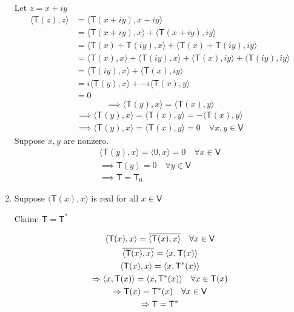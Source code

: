 \begin{enumerate}
 Let $
z = x + iy$
\begin{align}
\langle \mathsf{T}(z),z\rangle &= \langle \mathsf{T}(x+iy),x+iy\rangle
\\
&= \langle \mathsf{T}(x+iy),x\rangle + \langle
\mathsf{T}(x+iy),iy\rangle\\
&= \langle\mathsf{T}(x)+\mathsf{T}(iy),x\rangle + \langle
\mathsf{T}(x)+\mathsf{T}(iy),iy\rangle \\
&= \langle \mathsf{T}(x),x \rangle + \langle \mathsf{T}(iy),x \rangle +
\langle \mathsf{T}(x),iy\rangle + \langle \mathsf{T}(iy),iy\rangle\\
&= \langle \mathsf{T}(iy),x \rangle + \langle \mathsf{T}(x),iy\rangle
\\
&= i\langle\mathsf{T}(y),x \rangle + -i\langle\mathsf{T}(x),y\rangle\\
&= 0
\end{align}
\begin{equation}
\implies \langle\mathsf{T}(y),x \rangle = \langle\mathsf{T}(x),y\rangle
\end{equation}
\begin{gather}
\implies \langle\mathsf{T}(y),x \rangle =
\langle\mathsf{T}(x),y\rangle = - \langle\mathsf{T}(x),y\rangle\\
\implies \langle \mathsf{T}(y),x \rangle = \langle
\mathsf{T}(x),y\rangle =0 \quad \forall x,y \in \mathsf{V}
\end{gather}
Suppose $x,y$ are nonzero.
\begin{gather}
\langle \mathsf{T}(y),x\rangle = \langle 0,x\rangle = 0 \quad \forall
x \in \mathsf{V}\\
\implies \mathsf{T}(y) = 0 \quad \forall y \in \mathsf{V}\\
\implies \mathsf{T} = \mathsf{T}_0
\end{gather}
\item Suppose $\langle \mathsf{T}(x),x \rangle$ is real for all $x \in
  \mathsf{V}$

Claim: $\mathsf{T} = \mathsf{T}^*$

\begin{gather}
\langle \mathsf{T}(x),x \rangle = \overline{\langle
  \mathsf{T}(x),x\rangle}\quad \forall x \in \mathsf{V}\\
\overline{\langle \mathsf{T}(x),x \rangle} = \langle
x,\mathsf{T}(x)\rangle\\
\langle \mathsf{T}(x),x\rangle = \langle x,\mathsf{T}^*(x)\rangle\\
\implies \langle x, \mathsf{T}(x)\rangle = \langle x,\textsc{}
\mathsf{T}^*(x)\rangle \quad \forall x \in \mathsf{T}(x)\\
\implies \mathsf{T}(x) = \mathsf{T}^*(x) \quad \forall x \in
\mathsf{V}\\
\implies \mathsf{T} = \mathsf{T}^*
\end{gather}
\end{enumerate}
